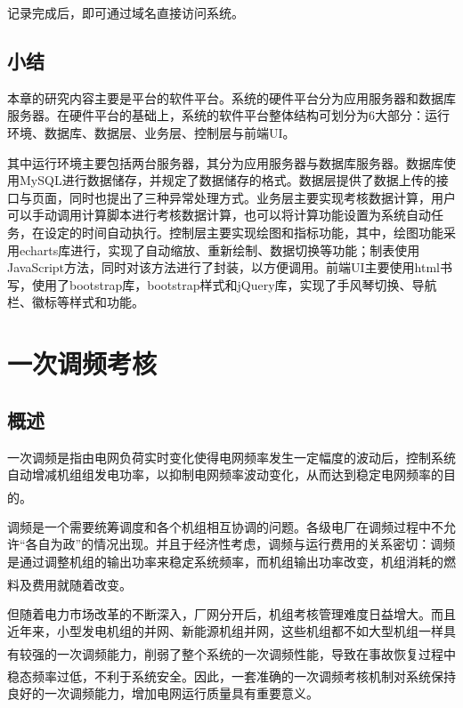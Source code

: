\documentclass[winfonts,UTF8,a4paper]{ctexart}
\newcommand{\upcite}[1]{\textsuperscript{\textsuperscript{\cite{#1}}}}
\begin{document}
记录完成后，即可通过域名直接访问系统。

\subsection{小结}
本章的研究内容主要是平台的软件平台。系统的硬件平台分为应用服务器和数据库服务器。在硬件平台的基础上，系统的软件平台整体结构可划分为6大部分：运行环境、数据库、数据层、业务层、控制层与前端UI。

其中运行环境主要包括两台服务器，其分为应用服务器与数据库服务器。数据库使用MySQL进行数据储存，并规定了数据储存的格式。数据层提供了数据上传的接口与页面，同时也提出了三种异常处理方式。业务层主要实现考核数据计算，用户可以手动调用计算脚本进行考核数据计算，也可以将计算功能设置为系统自动任务，在设定的时间自动执行。控制层主要实现绘图和指标功能，其中，绘图功能采用echarts库进行，实现了自动缩放、重新绘制、数据切换等功能；制表使用JavaScript方法，同时对该方法进行了封装，以方便调用。前端UI主要使用html书写，使用了bootstrap库，bootstrap样式和jQuery库，实现了手风琴切换、导航栏、徽标等样式和功能。






\newpage
\section{一次调频考核}
\subsection{概述}
一次调频是指由电网负荷实时变化使得电网频率发生一定幅度的波动后，控制系统自动增减机组组发电功率，以抑制电网频率波动变化，从而达到稳定电网频率的目的\upcite{2010}。



调频是一个需要统筹调度和各个机组相互协调的问题。各级电厂在调频过程中不允许“各自为政”的情况出现。并且于经济性考虑，调频与运行费用的关系密切：调频是通过调整机组的输出功率来稳定系统频率，而机组输出功率改变，机组消耗的燃料及费用就随着改变\upcite{dlxtzdh}。

但随着电力市场改革的不断深入，厂网分开后，机组考核管理难度日益增大。而且近年来，小型发电机组的并网、新能源机组并网，这些机组都不如大型机组一样具有较强的一次调频能力\upcite{jyzzdnkzhxdccn}，削弱了整个系统的一次调频性能，导致在事故恢复过程中稳态频率过低，不利于系统安全\upcite{20142jzyctp}。因此，一套准确的一次调频考核机制对系统保持良好的一次调频能力，增加电网运行质量具有重要意义。
\end{document}
